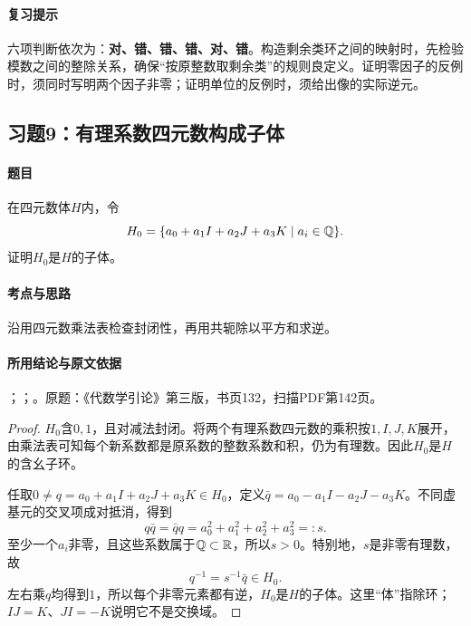 \paragraph{复习提示}

六项判断依次为：\textbf{对、错、错、错、对、错}。构造剩余类环之间的映射时，先检验模数之间的整除关系，确保“按原整数取剩余类”的规则良定义。证明零因子的反例时，须同时写明两个因子非零；证明单位的反例时，须给出像的实际逆元。



\subsection{习题9：有理系数四元数构成子体}

\label{ex:3:9}

\paragraph{题目}

在四元数体$H$内，令
\[
H_0=\{a_0+a_1I+a_2J+a_3K\mid a_i\in\mathbb Q\}.
\]
证明$H_0$是$H$的子体。

\paragraph{考点与思路}

沿用四元数乘法表检查封闭性，再用共轭除以平方和求逆。

\paragraph{所用结论与原文依据}

；；。原题：《代数学引论》第三版，书页132，扫描PDF第142页。


\begin{proof}

$H_0$含$0,1$，且对减法封闭。将两个有理系数四元数的乘积按$1,I,J,K$展开，由乘法表可知每个新系数都是原系数的整数系数和积，仍为有理数。因此$H_0$是$H$的含幺子环。

任取$0\ne q=a_0+a_1I+a_2J+a_3K\in H_0$，定义$\bar q=a_0-a_1I-a_2J-a_3K$。不同虚基元的交叉项成对抵消，得到
\[
q\bar q=\bar q q=a_0^2+a_1^2+a_2^2+a_3^2=:s.
\]
至少一个$a_i$非零，且这些系数属于$\mathbb Q\subset\mathbb R$，所以$s>0$。特别地，$s$是非零有理数，故
\[
q^{-1}=s^{-1}\bar q\in H_0.
\]
左右乘$q$均得到$1$，所以每个非零元素都有逆，$H_0$是$H$的子体。这里“体”指除环；$IJ=K$、$JI=-K$说明它不是交换域。

\end{proof}

